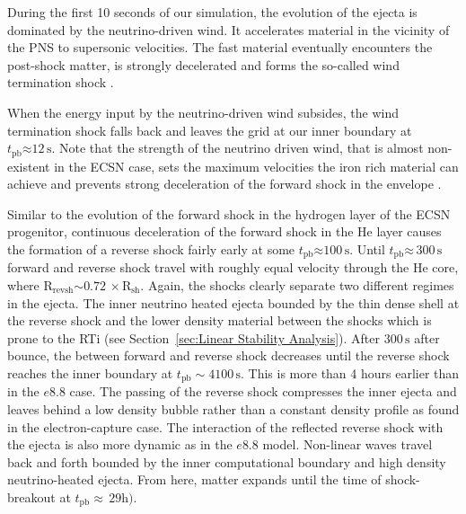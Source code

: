 \documentclass[fleqn,usenatbib]{mnras}
\newcommand{\tpb}{\ensuremath{t_{\text{pb}}}}
\newcommand{\nickel}{$\mathrm{Ni^{56}}$\xspace}
\renewcommand{\sec}{\xspace\ensuremath{\text{s}}}
\begin{document}
During the first 10 seconds of our simulation, the evolution of the ejecta is dominated by the neutrino-driven wind. It accelerates material in the vicinity of the PNS to supersonic velocities. The fast material eventually encounters the post-shock matter, is strongly decelerated and forms the so-called wind termination shock \citep{Wanajo2002,Arcones2007}. 

When the energy input by the neutrino-driven wind subsides, the wind termination shock falls back and leaves the grid at our inner boundary at $\tpb\mathord{\approx} 12\,\sec$.
Note that the strength of the neutrino driven wind, that is almost non-existent in the ECSN case, sets the maximum velocities the iron rich material can achieve and prevents strong deceleration of the forward shock in the envelope \citep{Wongwathanarat2015}. 

Similar to the evolution of the forward shock in the hydrogen layer of the ECSN progenitor, continuous deceleration of the forward shock in the He layer causes the formation of a reverse shock fairly early at some $\tpb\mathord{\approx} 100\,\sec$. Until $\tpb\mathord{\approx}\, 300\,\sec$ forward and reverse shock travel with roughly equal velocity through the He core, where $\mathrm{R_{revsh}\mathord{\sim 0.72}\,\times R_{sh}}$. 
Again, the shocks clearly separate two different regimes in the ejecta. The inner neutrino heated ejecta bounded by the thin dense shell at the reverse shock and the lower density material between the shocks which is prone to the RTi (see Section~\ref{sec:Linear Stability Analysis}).
%
After $300\,\sec$ after bounce, the between forward and reverse shock decreases until the reverse shock reaches the inner boundary at $t_{\mathrm{pb}}\sim 4100\,\text{s}$. This is more than 4 hours earlier than in the $e8.8$ case. The passing of the reverse shock compresses the inner ejecta and leaves behind a low density bubble rather than a constant density profile as found in the electron-capture case.
The interaction of the reflected reverse shock with the ejecta is also more dynamic as in the $e8.8$ model. Non-linear waves travel back and forth bounded by the inner computational boundary and high density neutrino-heated ejecta. From here, matter expands until the time of shock-breakout at $\tpb\approx\, 29\mathrm{h})$. %

\end{document}
